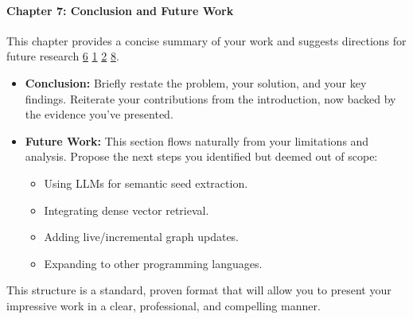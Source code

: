 \documentclass{article}
\begin{document}
\paragraph{\textbf{Chapter 7: Conclusion and Future Work}}

This chapter provides a concise summary of your work and suggests directions for future research \hyperref[ref:6]{6} \hyperref[ref:1]{1} \hyperref[ref:2]{2} \hyperref[ref:8]{8}.

\begin{itemize}
\item \textbf{Conclusion:} Briefly restate the problem, your solution, and your key findings. Reiterate your contributions from the introduction, now backed by the evidence you've presented.


\item \textbf{Future Work:} This section flows naturally from your limitations and analysis. Propose the next steps you identified but deemed out of scope:

\begin{itemize}
\item Using LLMs for semantic seed extraction.


\item Integrating dense vector retrieval.


\item Adding live/incremental graph updates.


\item Expanding to other programming languages.


\end{itemize}


\end{itemize}

This structure is a standard, proven format that will allow you to present your impressive work in a clear, professional, and compelling manner.
\end{document}
